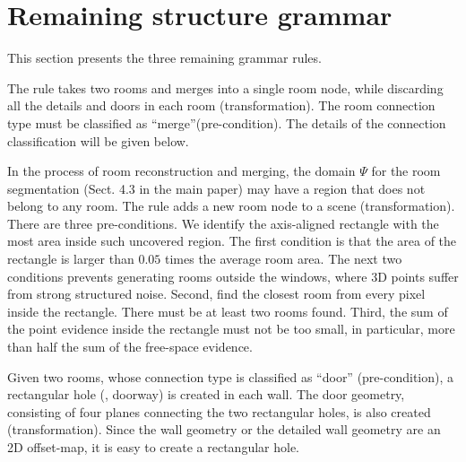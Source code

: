 \section{Remaining structure grammar}

This section presents the three remaining grammar rules.

 The rule takes two rooms and merges into
a single room node, while discarding all the details and doors in each
room (transformation). The room connection type must be
classified as ``merge''(pre-condition). The details of the connection
classification will be given below.

 In the process of room reconstruction
and merging, the domain $\Psi$ for the room segmentation (Sect. 4.3 in
the main paper) may have a region that does not belong to any room. The
rule adds a new room node to a scene
(transformation). 
%
There are three pre-conditions. We identify the axis-aligned rectangle
with the most area inside such uncovered region. The first condition is
that the area of the rectangle is larger than $0.05$ times the average
room area.  The next two conditions prevents generating rooms outside
the windows, where 3D points suffer from strong structured noise.
%
Second, find the closest room from every pixel inside the
rectangle. There must be at least two rooms found.
Third, the sum of the point evidence inside the rectangle must not be
too small, in particular, more than half the sum of the free-space
evidence.
%

 Given two rooms, whose connection type
is classified as ``door'' (pre-condition), a rectangular hole (\ie,
doorway) is created in each wall. The door geometry, consisting of four
planes connecting the two rectangular holes, is also created
(transformation). Since the wall geometry or the detailed wall geometry
are an 2D offset-map, it is easy to create a rectangular hole.


